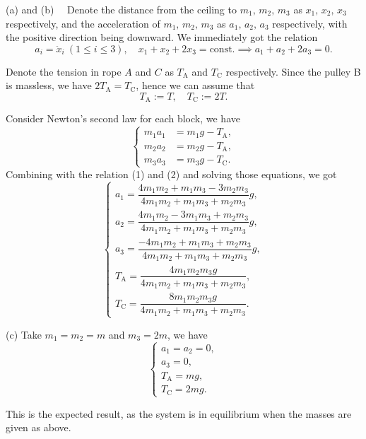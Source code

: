 \documentclass{article}
\begin{document}
\begin{solution}
    (a) and (b) \ \ Denote the distance from the ceiling to \( m_1,\,m_2,\,m_3 \) as \( x_1,\,x_2,\,x_3 \) respectively, and the acceleration of \( m_1,\,m_2,\,m_3 \) as \( a_1,\,a_2,\,a_3 \) respectively, with the positive direction being downward. We immediately got the relation
    \[ a_i=\ddot{x}_i \ (1\le i\le 3),\quad x_1+x_2+2x_3=\text{const.}\implies a_1+a_2+2a_3=0. \tag{1}\] \par
    Denote the tension in rope \( A \) and \( C \) as \( T_\mathrm{A} \) and \( T_\mathrm{C} \) respectively. Since the pulley B is massless, we have \( 2T_\mathrm{A}=T_\mathrm{C} \), hence we can assume that
    \[ T_\mathrm{A }:=T,\quad T_\mathrm{C }:=2T. \tag{2}\] \par
    Consider Newton's second law for each block, we have
    \[ \begin{cases}
        m_1 a_1 &= m_1 g - T_\mathrm{A }, \\
        m_2 a_2 &= m_2 g - T_\mathrm{A }, \\
        m_3 a_3 &= m_3 g - T_\mathrm{C }.
    \end{cases} \]
    Combining with the relation (1) and (2) and solving those equations, we got
    \[ \begin{cases}
        a_1=\dfrac{4m_1m_2+m_1m_3-3m_2m_3}{4m_1m_2+m_1m_3+m_2m_3}g,\\
        a_2=\dfrac{4m_1m_2-3m_1m_3+m_2m_3}{4m_1m_2+m_1m_3+m_2m_3}g,\\
        a_3=\dfrac{-4m_1m_2+m_1m_3+m_2m_3}{4m_1m_2+m_1m_3+m_2m_3}g,\\
        T_\mathrm{A}=\dfrac{4m_1m_2m_3g}{4m_1m_2+m_1m_3+m_2m_3},\\
        T_\mathrm{C}=\dfrac{8m_1m_2m_3g}{4m_1m_2+m_1m_3+m_2m_3}.
    \end{cases} \]  \par
    (c) Take \( m_1=m_2=m \) and \( m_3=2m \), we have
    \[ \begin{cases}
        a_1=a_2=0,\\
        a_3=0,\\
        T_\mathrm{A}=mg,\\
        T_\mathrm{C}=2mg.
    \end{cases} \]  \par
    This is the expected result, as the system is in equilibrium when the masses are given as above.
\end{solution}
\end{document}
